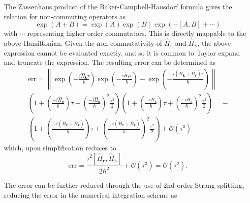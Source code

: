 The Zassenhaus product of the Baker-Campbell-Hausdorf formula \cite{some citation} gives the relation for non-commuting operators as
\begin{equation}
    \exp\left( A+B \right) = \exp\left(A\right)\exp\left(B\right)\exp\left(-[A,B] + \cdots \right)
\end{equation}
with $\cdots$ representing higher order commutators. This is directly mappable to the above Hamiltonian. Given the non-commutativity of $\hat{H}_{\textbf{r}}$ and $\hat{H}_{\textbf{k}}$, the above expression cannot be evaluated exactly, and so it is common to Taylor expand and truncate the expression. The resulting error can be determined as
\begin{subequations}
\begin{align}
    \text{err} = \left\| \exp\left(-\frac{i\hat{H}_{\textbf{k}}\tau}{\hbar}\right)\exp\left(-\frac{i\hat{H}_{\textbf{r}}\tau}{\hbar}\right) - \exp\left(-\frac{i(\hat{H}_{\textbf{k}} + \hat{H}_{\textbf{r}})\tau}{\hbar}\right) \right\| \\
    \left(1 + \left(\frac{-i\hat{H}_{\textbf{k}}}{\hbar}\right)\tau + \left(\frac{-i\hat{H}_{\textbf{k}}}{\hbar}\right)^2\frac{\tau^2}{2}  \right)\left(1 + \left(\frac{-i\hat{H}_{\textbf{r}}}{\hbar}\right)\tau + \left(\frac{-i\hat{H}_{\textbf{r}}}{\hbar}\right)^2\frac{\tau^2}{2}  \right) &-\\ \left(1 + \left(\frac{-i(\hat{H}_{\textbf{r}} + \hat{H}_{\textbf{r}})}{\hbar}\right)\tau + \left(\frac{-i(\hat{H}_{\textbf{r}} + \hat{H}_{\textbf{r}})}{\hbar}\right)^2\frac{\tau^2}{2}  \right) + \mathcal{O}(\tau^3)
\end{align}
\end{subequations}
which, upon simplification reduces to
\begin{equation}
\text{err} = \frac{\tau^2[{\hat{H}_{\textbf{r}}},{\hat{H}_{\textbf{k}}}]}{2\hbar^2} + \mathcal{O}(\tau^3) = \mathcal{O}(\tau^2).
\end{equation}

The error can be further reduced through the use of 2nd order Strang-splitting, reducing the error in the numerical integration scheme as

